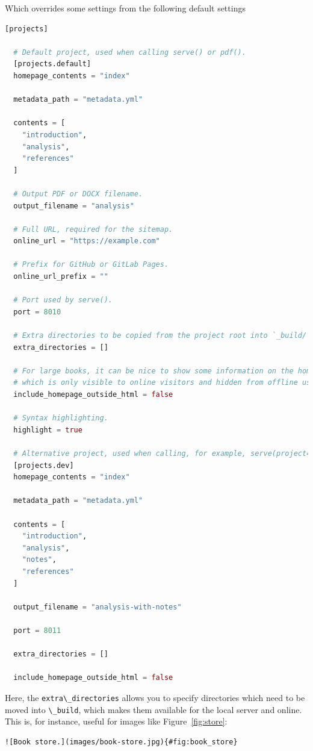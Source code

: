\documentclass[
  notoc %
]{tufte-book}
\newcommand{\passthrough}[1]{#1}
\begin{document}
Which overrides some settings from the following default settings

\begin{lstlisting}[language=Julia]
[projects]

  # Default project, used when calling serve() or pdf().
  [projects.default]
  homepage_contents = "index"

  metadata_path = "metadata.yml"

  contents = [
    "introduction",
    "analysis",
    "references"
  ]

  # Output PDF or DOCX filename.
  output_filename = "analysis"

  # Full URL, required for the sitemap.
  online_url = "https://example.com"

  # Prefix for GitHub or GitLab Pages.
  online_url_prefix = ""

  # Port used by serve().
  port = 8010

  # Extra directories to be copied from the project root into `_build/`.
  extra_directories = []

  # For large books, it can be nice to show some information on the homepage
  # which is only visible to online visitors and hidden from offline users (PDF).
  include_homepage_outside_html = false

  # Syntax highlighting.
  highlight = true

  # Alternative project, used when calling, for example, serve(project="dev").
  [projects.dev]
  homepage_contents = "index"

  metadata_path = "metadata.yml"

  contents = [
    "introduction",
    "analysis",
    "notes",
    "references"
  ]

  output_filename = "analysis-with-notes"

  port = 8011

  extra_directories = []

  include_homepage_outside_html = false

\end{lstlisting}

Here, the \passthrough{\lstinline!extra\_directories!} allows you to
specify directories which need to be moved into
\passthrough{\lstinline!\_build!}, which makes them available for the
local server and online. This is, for instance, useful for images like
Figure~\ref{fig:store}:

\begin{lstlisting}
![Book store.](images/book-store.jpg){#fig:book_store}
\end{lstlisting}
\end{document}
